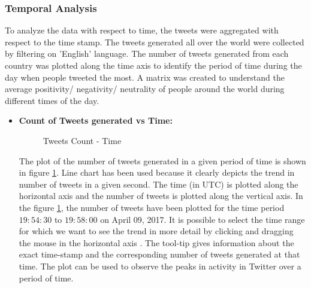 \documentclass[9pt,twocolumn,twoside]{styles/osajnl}
\begin{document}
\subsubsection{Temporal Analysis}
To analyze the data with respect to time, the tweets were aggregated with respect to the time stamp. The tweets generated all over the world were collected by filtering on 'English' language. The number of tweets generated from each country was plotted along the time axis to identify the period of time during the day when people tweeted the most. A matrix was created to understand the average positivity/ negativity/ neutrality of people around the world during different times of the day. 
\begin{itemize}
    \item \textbf{Count of Tweets generated vs Time:}\\
    \begin{figure}[htbp]
    \centering
    \caption{Tweets Count - Time}
    \label{fig:tweetcnt}
    \end{figure}
    The plot of the number of tweets generated in a given period of time is shown in figure \ref{fig:tweetcnt}. Line chart has been used because it clearly depicts the trend in number of tweets in a given second. The time (in UTC) is plotted along the horizontal axis and the number of tweets is plotted along the vertical axis. In the figure \ref{fig:tweetcnt}, the number of tweets have been plotted for the time period $19:54:30$ to $19:58:00$ on April 09, 2017. It is possible to select the time range for which we want to see the trend in more detail by clicking and dragging the mouse in the horizontal axis \cite{www-HCMasterdetail}. The tool-tip gives information about the exact time-stamp and the corresponding number of tweets generated at that time. The plot can be used to observe the peaks in activity in Twitter over a period of time. 

\end{itemize}
\end{document}
